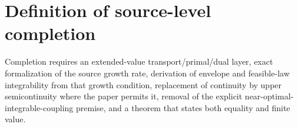 \section{Definition of source-level completion}
Completion requires an extended-value transport/primal/dual layer, exact formalization of the source growth rate, derivation of envelope and feasible-law integrability from that growth condition, replacement of continuity by upper semicontinuity where the paper permits it, removal of the explicit near-optimal-integrable-coupling premise, and a theorem that states both equality and finite value.

